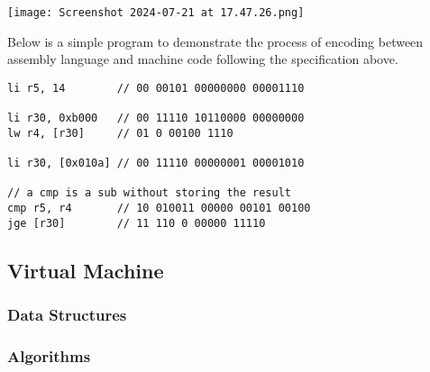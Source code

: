 \bigskip

\texttt{[image: Screenshot 2024-07-21 at 17.47.26.png]}

\bigskip

Below is a simple program to demonstrate the process of encoding between assembly language and machine code following the specification above.

\begin{lstlisting}
li r5, 14        // 00 00101 00000000 00001110

li r30, 0xb000   // 00 11110 10110000 00000000
lw r4, [r30]     // 01 0 00100 1110

li r30, [0x010a] // 00 11110 00000001 00001010

// a cmp is a sub without storing the result
cmp r5, r4       // 10 010011 00000 00101 00100
jge [r30]        // 11 110 0 00000 11110
\end{lstlisting}

\subsection{Virtual Machine}
\subsubsection{Data Structures}
\subsubsection{Algorithms}